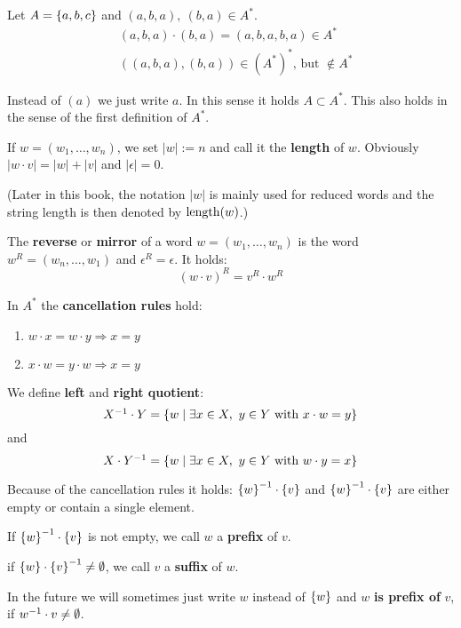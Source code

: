 Let $A = \mbox{$\{a,b,c\}$}$ and $(a,b,a),\ (b,a) \in A^*$.
\begin{eqnarray*}
& (a,b,a)\cdot(b,a) = (a,b,a,b,a) \in A^* \\
& ((a,b,a),(b,a)) \in (A^*)^*\text{, but }\notin A^*
\end{eqnarray*}

Instead of $(a)$ we just write $a$. In this sense it holds $A \subset A^*$. This
also holds in the sense of the first definition of $A^*$.

If $w = (w_1, \ldots, w_n)$, we set $|w| := n$ and call it the {\bf length} of
$w$. Obviously $|w \cdot v| = |w| + |v|$ and $|\epsilon| = 0$.

(Later in this book, the notation $|w|$ is mainly used for reduced words and
the string length is then denoted by $\mathrm{length}({w})$.)

The {\bf reverse} or {\bf mirror} of a word $w = (w_1, \ldots, w_n)$ is the word
$w^R = (w_n, \ldots, w_1)$ and $\epsilon^R = \epsilon$. It holds:
\[ (w \cdot v)^R = v^R \cdot w^R \]

In $A^*$ the {\bf cancellation rules} hold:
\begin{enumerate}
  \item $w \cdot x = w \cdot y \Rightarrow x = y$
  \item $x \cdot w = y \cdot w \Rightarrow x = y$
\end{enumerate}

We define {\bf left} and {\bf right quotient}:
\[ \mbox{${X}^{-1}$} \cdot Y = \mbox{$\{w \mid \exists x \in X,\ y \in Y\text{ with }x
\cdot w = y \}$} \]
and 
\[ X \cdot \mbox{${Y}^{-1}$} = \mbox{$\{w \mid \exists x \in X,\ y \in Y\text{ with } w
\cdot y = x \}$} \]

Because of the cancellation rules it holds: $\mbox{${\mbox{$\{w\}$}}^{-1}$} \cdot \mbox{$\{v\}$}$
and $\mbox{${\mbox{$\{w\}$}}^{-1}$} \cdot \mbox{$\{v\}$}$ are either empty or contain a single
element.

If $\mbox{${\mbox{$\{w\}$}}^{-1}$} \cdot \mbox{$\{v\}$}$ is not empty, we call $w$ a {\bf
prefix} of $v$.

if $\mbox{$\{w\}$} \cdot \mbox{${\mbox{$\{v\}$}}^{-1}$} \neq \emptyset$, we call $v$ a {\bf suffix}
of $w$.

In the future we will sometimes just write $w$ instead of $\mbox{$\{w\}$}$ and
$w$ {\bf is prefix of} $v$, if $\mbox{${w}^{-1}$} \cdot v \neq \emptyset$.

